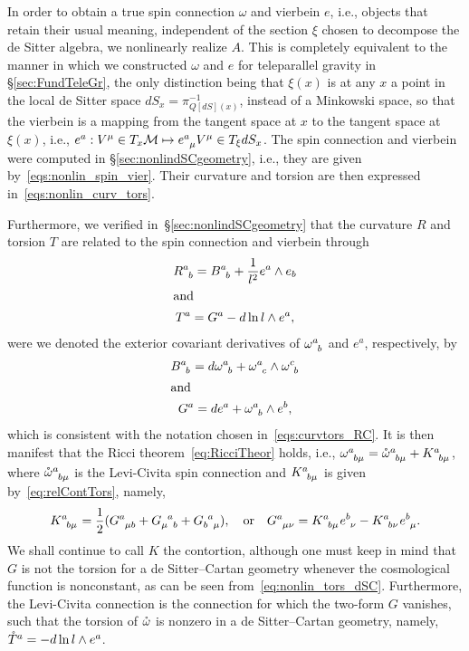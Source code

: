 \documentclass[
final,
11pt,
a4paper,
DIV=11,
headinclude=true,
footinclude=false,
bibliography=totoc,
twoside=true,  %
BCOR=5mm
]{scrbook}
\begin{document}
In order to obtain a true spin connection $\omega$ and vierbein 
$e$, i.e., objects that retain their usual meaning, independent 
of the section $\xi$ chosen to decompose the de Sitter algebra, 
we nonlinearly realize $A$. This is completely equivalent to the 
manner in which we constructed $\omega$ and $e$ for teleparallel 
gravity in \S\ref{sec:FundTeleGr}, the only distinction being 
that $\xi(x)$ is at any $x$ a point in the local de Sitter space 
$dS_x = \pi^{-1}_{Q[dS](x)}$, instead of a Minkowski space, so 
that the vierbein is a mapping from the tangent space at $x$ to 
the tangent space at $\xi(x)$, i.e., $e^a : V^\mu \in T_x\mc{M} 
\mapsto e\ind{^a_\mu} V^\mu \in T_\xi dS_x$. The spin connection 
and vierbein were computed in \S\ref{sec:nonlindSCgeometry}, 
i.e., they are given by~\eqref{eqs:nonlin_spin_vier}. Their 
curvature and torsion are then expressed 
in~\eqref{eqs:nonlin_curv_tors}. 

Furthermore, we verified in~\S\ref{sec:nonlindSCgeometry} that 
the curvature $R$ and torsion $T$ are related to the spin 
connection and vierbein through
\begin{subequations}
\begin{gather}
\label{eq:nonlin_curv_dSC}
  R\ind{^a_b} = B\ind{^a_b} + \frac{1}{l^2} e^a \wedge e_b
  \\
  \shortintertext{and}
  \label{eq:nonlin_tors_dSC}
  T^a = G^a - d \ln l \wedge e^a,
\end{gather}
\end{subequations}
were we denoted the exterior covariant derivatives of 
$\omega\ind{^a_b}$ and $e^a$, respectively, 
by
\begin{subequations}
\begin{gather}
\label{eq:ext_cov_der_spin}
  B\ind{^a_b} = d\omega\ind{^a_b} + \omega\ind{^a_c} \wedge 
  \omega\ind{^c_b}\\
\shortintertext{and}
\label{eq:ext_cov_der_vier}
  G^a = de^a + \omega\ind{^a_b} \wedge e^b,
\end{gather}
\end{subequations}
which is consistent with the notation chosen 
in~\eqref{eqs:curvtors_RC}. It is then manifest that the Ricci 
theorem~\eqref{eq:RicciTheor} holds, i.e., $\omega\ind{^a_{b\mu}} 
= \mring{\omega}\ind{^a_{b\mu}} + K\ind{^a_{b\mu}}$, where 
$\mring{\omega}\ind{^a_{b\mu}}$ is the Levi-Civita spin 
connection and $K\ind{^a_{b\mu}}$ is given 
by~\eqref{eq:relContTors}, namely,
\begin{equation*}
  K\ind{^a_{b\mu}} = \frac{1}{2} (G\ind{^a_{\mu b}} 
  + G\ind{_\mu^a_b} + G\ind{_b^a_\mu}),
  \quad\text{or}\quad
  G\ind{^a_{\mu\nu}} = K\ind{^a_{b\mu}} e\ind{^b_\nu} 
  - K\ind{^a_{b\nu}} e\ind{^b_\mu}.
\end{equation*}
We shall continue to call $K$ the contortion, although one must 
keep in mind that $G$ is not the torsion for a de Sitter--Cartan 
geometry whenever the cosmological function is nonconstant, as 
can be seen from~\eqref{eq:nonlin_tors_dSC}.  Furthermore, the 
Levi-Civita connection is the connection for which the two-form 
$G$ vanishes, such that the torsion of $\mathring{\omega}$ is 
nonzero in a de Sitter--Cartan geometry, namely, $\mathring{T}^a 
= - d\ln l \wedge e^a$.
\end{document}
